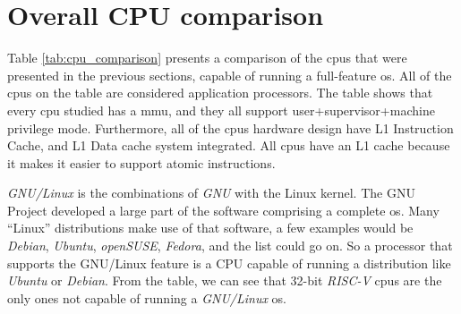 \section{Overall CPU comparison}
\label{section:cpu_comparison}
Table \ref*{tab:cpu_comparison} presents a comparison of the \acrshort{cpu}s that were presented in the previous sections, capable of running a full-feature \acrfull{os}. All of the \acrshort{cpu}s on the table are considered application processors. The table shows that every \acrshort{cpu} studied has a \acrfull{mmu}, and they all support \acrshort{user}+\acrshort{supervisor}+\acrshort{machine} privilege mode. Furthermore, all of the \acrshort{cpu}s hardware design have L1 Instruction Cache, and L1 Data cache system integrated. All \acrshort{cpu}s have an L1 cache because it makes it easier to support atomic instructions.

\textit{GNU/Linux} is the combinations of \textit{GNU} with the Linux kernel. The GNU Project developed a large part of the software comprising a complete \acrfull{os}. Many \enquote{Linux} distributions make use of that software, a few examples would be \textit{Debian}, \textit{Ubuntu}, \textit{openSUSE}, \textit{Fedora}, and the list could go on. So a processor that supports the GNU/Linux feature is a CPU capable of running a distribution like \textit{Ubuntu} or \textit{Debian}. From the table, we can see that 32-bit \textit{RISC-V} \acrshort{cpu}s are the only ones not capable of running a \textit{GNU/Linux} \acrfull{os}.

